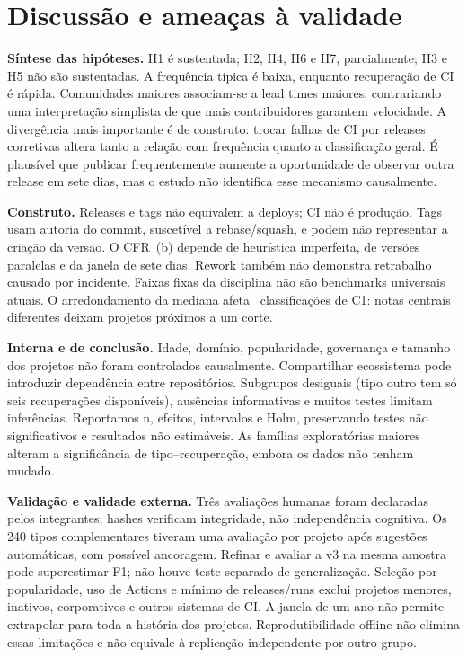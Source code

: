 \section{Discussão e ameaças à validade}

\textbf{Síntese das hipóteses.} H1 é sustentada; H2, H4, H6 e H7, parcialmente;
H3 e H5 não são sustentadas. A frequência típica é baixa, enquanto recuperação de
CI é rápida. Comunidades maiores associam-se a lead times maiores, contrariando
uma interpretação simplista de que mais contribuidores garantem velocidade.
A divergência mais importante é de construto: trocar falhas de CI por releases
corretivas altera tanto a relação com frequência quanto a classificação geral.
É plausível que publicar frequentemente aumente a oportunidade de observar outra
release em sete dias, mas o estudo não identifica esse mecanismo causalmente.

\textbf{Construto.} Releases e tags não equivalem a deploys; CI não é produção.
Tags usam autoria do commit, suscetível a rebase/squash, e podem não representar
a criação da versão. O CFR~(b) depende de heurística imperfeita, de versões
paralelas e da janela de sete dias. Rework também não demonstra retrabalho causado
por incidente. Faixas fixas da disciplina não são benchmarks universais atuais.
O arredondamento da mediana afeta \labACOneFracionarias\ classificações de C1:
notas centrais diferentes deixam projetos próximos a um corte.

\textbf{Interna e de conclusão.} Idade, domínio, popularidade, governança e tamanho
dos projetos não foram controlados causalmente. Compartilhar ecossistema pode
introduzir dependência entre repositórios. Subgrupos desiguais (tipo outro tem só
seis recuperações disponíveis), ausências informativas e muitos testes limitam
inferências. Reportamos n, efeitos, intervalos e Holm, preservando testes não
significativos e resultados não estimáveis. As famílias exploratórias maiores
alteram a significância de tipo--recuperação, embora os dados não tenham mudado.

\textbf{Validação e validade externa.} Três avaliações humanas foram declaradas
pelos integrantes; hashes verificam integridade, não independência cognitiva.
Os 240 tipos complementares tiveram uma avaliação por projeto após sugestões
automáticas, com possível ancoragem. Refinar e avaliar a v3 na mesma amostra pode
superestimar F1; não houve teste separado de generalização. Seleção por popularidade,
uso de Actions e mínimo de releases/runs exclui projetos menores, inativos,
corporativos e outros sistemas de CI. A janela de um ano não permite extrapolar
para toda a história dos projetos. Reprodutibilidade offline não elimina essas
limitações e não equivale à replicação independente por outro grupo.


